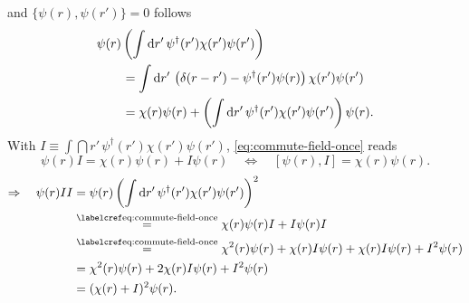 and \(\{\psi(r),\psi(r')\}=0\) follows
\begin{align}
&\psi(r)\left(\int \mathop{}\!\mathrm{d} r'\,\psi^\dagger(r')\chi(r')\psi(r')\right)
   \notag\\
&\qquad=\int \mathop{}\!\mathrm{d} r'\,
  \left(\delta(r-r')-\psi^\dagger(r')\psi(r)\right)\chi(r')\psi(r')
   \notag\\
&\qquad=\chi(r)\psi(r)
  +\left(\int \mathop{}\!\mathrm{d} r'\,\psi^\dagger(r')\chi(r')\psi(r')\right)\psi(r).
\label{eq:commute-field-once}
\end{align}
With \(I\equiv\int \dint r'\,\psi^\dagger(r')\chi(r')\psi(r')\),
\cref{eq:commute-field-once} reads
\[
\psi(r)I=\chi(r)\psi(r)+I\psi(r)
\quad\Leftrightarrow\quad [\psi(r),I]=\chi(r)\psi(r).
\]
\begin{align}
\Rightarrow\quad\psi(r)II
  &=\psi(r)\left(\int \dint r'\,\psi^\dagger(r')\chi(r')\psi(r')\right)^2
    \notag\\
  &\stepref{eq:commute-field-once}\chi(r)\psi(r)I+I\psi(r)I
    \notag\\
  &\stepref{eq:commute-field-once}
       \chi^2(r)\psi(r)+\chi(r)I\psi(r)+\chi(r)I\psi(r)+I^2\psi(r)
    \notag\\
  &=\chi^2(r)\psi(r)+2\chi(r)I\psi(r)+I^2\psi(r)
    \notag\\
  &=(\chi(r)+I)^2\psi(r).
\label{eq:commute-field-twice}
\end{align}

